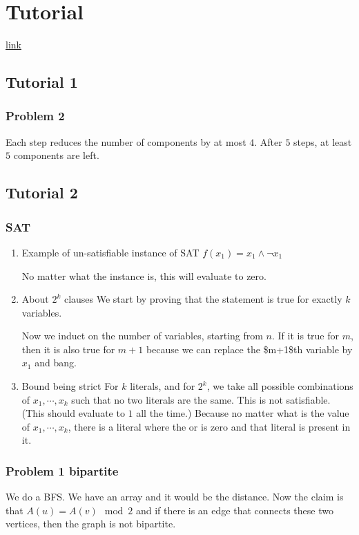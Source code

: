 \documentclass[11pt]{article}
\begin{document}
\section{Tutorial}
\label{sec:org354b0fb}
\href{http://discretemath.imp.fu-berlin.de/DMII-2018-19/}{link}
\subsection{Tutorial 1}
\label{sec:orgfbc71d8}
\subsubsection{Problem 2}
\label{sec:org5b03334}
Each step reduces the number of components by at most \(4\). After \(5\) steps, at least \(5\) components are left. 
\subsection{Tutorial 2}
\label{sec:orgcd6ed45}
\subsubsection{SAT}
\label{sec:org4187d21}
\begin{enumerate}
\item Example of un-satisfiable instance of SAT
\label{sec:org976dc56}
\(f(x_1) = x_1 \wedge \neg x_1\)

No matter what the instance is, this will evaluate to zero. 
\item About \(2^k\) clauses
\label{sec:org5d7bc67}
We start by proving that the statement is true for exactly \(k\) variables. 

Now we induct on the number of variables, starting from \(n\). If it is true
for \(m\), then it is also true for \(m+1\) because we can replace the \$m+1\$th
variable by \(x_1\) and bang.
\item Bound being strict
\label{sec:org17440cc}
For \(k\) literals, and for \(2^k\), we take all possible combinations of \(x_1,
     \cdots, x_k\) such that no two literals are the same. This is not
satisfiable. (This should evaluate to \(1\) all the time.) Because no matter
what is the value of \(x_1, \cdots, x_k\), there is a literal where the or is
zero and that literal is present in it.
\end{enumerate}
\subsubsection{Problem 1 bipartite}
\label{sec:orgdd7461c}
We do a BFS. We have an array and it would be the distance. Now the claim is
that \(A(u) = A(v) \mod 2\) and if there is an edge that connects these two
vertices, then the graph is not bipartite.
\end{document}
